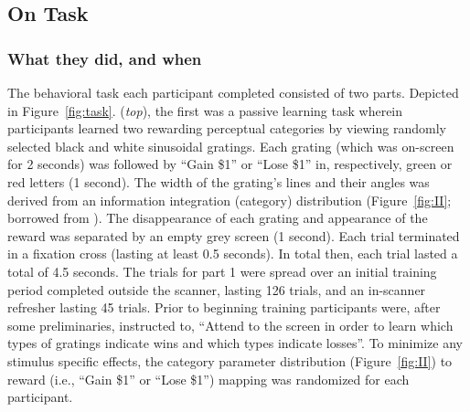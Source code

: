 \documentclass[doc,12pt]{apa}        %
\begin{document}
\subsection{On Task}
\label{sub:to_task}
\subsubsection{What they did, and when}
\label{subsub:whatwhen}
The behavioral task each participant completed consisted of two parts.  Depicted in Figure~\ref{fig:task}. (\emph{top}), the first was a passive learning task wherein participants learned two rewarding perceptual categories by viewing randomly selected black and white sinusoidal gratings.  Each grating (which was on-screen for 2 seconds) was followed by ``Gain \$1'' or ``Lose \$1'' in, respectively, green or red letters (1 second).  The width of the grating's lines and their angles was derived from an information integration (category) distribution (Figure~\ref{fig:II}; borrowed from ).  The disappearance of each grating and appearance of the reward was separated by an empty grey screen (1 second).  Each trial terminated in a fixation cross (lasting at least 0.5 seconds). In total then, each trial lasted a total of 4.5 seconds.  The trials for part 1 were spread over an initial training period completed outside the scanner, lasting 126 trials, and an in-scanner refresher lasting 45 trials.  Prior to beginning training participants were, after some preliminaries, instructed to, ``Attend to the screen in order to learn which types of gratings indicate wins and which types indicate losses''.  To minimize any stimulus specific effects, the category parameter distribution (Figure~\ref{fig:II}) to reward (i.e., ``Gain \$1'' or ``Lose \$1'') mapping was randomized for each participant.
\end{document}
